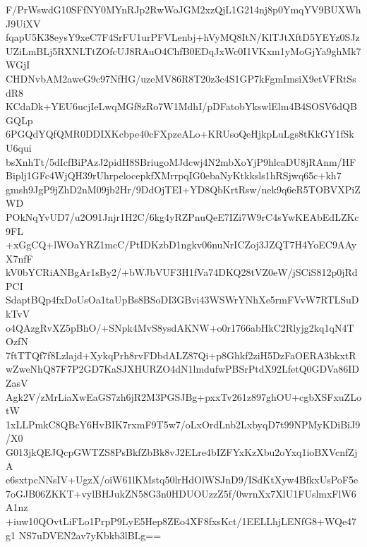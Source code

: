 F/PrWswdG10SFfNY0MYnRJp2RwWoJGM2xzQjL1G214nj8p0YmqYV9BUXWhJ9UiXV
fqapU5K38eysY9xeC7F4SrFU1urPFVLenbj+hVyMQ8ItN/KlTJtXftD5YEYz0SJz
UZiLmBLj5RXNLTtZOfcUJ8RAuO4ChfB0EDqJxWc0I1VKxm1yMoGjYa9ghMk7WGjI
CHDNvbAM2aweG9c97NfHG/uzeMV86R8T20z3c4S1GP7kFgmImsiX9etVFRtSsdR8
KCdaDk+YEU6ucjIeLwqMGf8zRo7W1MdhI/pDFatobYkswlElm4B4SOSV6dQBGQLp
6PGQdYQfQMR0DDIXKcbpe40cFXpzeALo+KRUsoQeHjkpLuLgs8tKkGY1fSkU6qui
bsXnhTt/5dIcfBiPAzJ2pidH8SBriugoMJdcwj4N2mbXoYjP9hlcaDU8jRAnm/HF
Biplj1GFc4WjQH39rUhrpelocepkfXMrrpqIG0ebaNyKtkksls1hRSjwq65c+kh7
gmsh9JgP9jZhD2nM09jb2Hr/9DdOjTEI+YD8QbKrtRsw/nek9q6eR5TOBVXPiZWD
POkNqYvUD7/u2O91Jnjr1H2C/6kg4yRZPnuQeE7IZi7W9rC4sYwKEAbEdLZKc9FL
+xGgCQ+lWOaYRZ1mcC/PtIDKzbD1ngkv06nuNrICZoj3JZQT7H4YoEC9AAyX7nfF
kV0bYCRiANBgAr1sBy2/+bWJbVUF3H1fVa74DKQ28tVZ0eW/jSCiS812p0jRdPCI
SdaptBQp4fxDoUsOa1taUpBs8BSoDI3GBvi43WSWrYNhXe5rmFVvW7RTLSuDkTvV
o4QAzgRvXZ5pBhO/+SNpk4MvS8ysdAKNW+o0r1766abHkC2Rlyjg2kq1qN4TOzfN
7ftTTQf7f8Lzlajd+XykqPrh8rvFDbdALZ87Qi+p8Ghkf2ziH5DzFaOERA3bkxtR
wZweNhQ87F7P2GD7KaSJXHURZO4dN1lmdufwPBSrPtdX92LfetQ0GDVa86IDZasV
Agk2V/zMrLiaXwEaGS7zh6jR2M3PGSJBg+pxxTv261z897ghOU+cgbXSFxuZLotW
1xLLPmkC8QBcY6HvBIK7rxmF9T5w7/oLxOrdLnb2LxbyqD7t99NPMyKDiBiJ9/X0
G013jkQEJQcpGWTZS8PsBkfZbBk8vJ2ELre4bIZFYxKzXbu2oYxq1ioBXVcnfZjA
e6sxtpcNNsIV+UgzX/oiW61lKMstq50lrHdOlWSJnD9/ISdKtXyw4BfkxUsPoF5e
7oGJB06ZKKT+vylBHJukZN58G3n0HDUOUzzZ5f/0wrnXx7XlU1FUslmxFlW6A1nz
+iuw10QOvtLiFLo1PrpP9LyE5Hep8ZEo4XF8fxsKct/1EELLhjLENfG8+WQe47g1
NS7uDVEN2av7yKbkb3lBLg==
